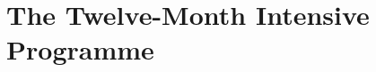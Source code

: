 \documentclass[
    12pt,
    a4paper,
    oneside,
    openany
]{book}
\begin{document}



\part{The Twelve-Month Intensive Programme}



\end{document}
